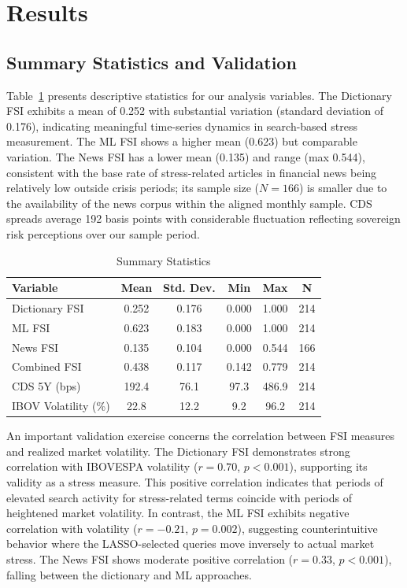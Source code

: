\section{Results}\label{sec:results}

\subsection{Summary Statistics and Validation}

Table~\ref{tab:summary} presents descriptive statistics for our analysis variables. The Dictionary FSI exhibits a mean of 0.252 with substantial variation (standard deviation of 0.176), indicating meaningful time-series dynamics in search-based stress measurement. The ML FSI shows a higher mean (0.623) but comparable variation. The News FSI has a lower mean (0.135) and range (max 0.544), consistent with the base rate of stress-related articles in financial news being relatively low outside crisis periods; its sample size ($N = 166$) is smaller due to the availability of the news corpus within the aligned monthly sample. CDS spreads average 192 basis points with considerable fluctuation reflecting sovereign risk perceptions over our sample period.

\begin{table}[htbp]
\centering
\caption{Summary Statistics}\label{tab:summary}
\begin{tabular}{lccccc}
\hline
Variable & Mean & Std. Dev. & Min & Max & N \\
\hline
Dictionary FSI & 0.252 & 0.176 & 0.000 & 1.000 & 214 \\
ML FSI & 0.623 & 0.183 & 0.000 & 1.000 & 214 \\
News FSI & 0.135 & 0.104 & 0.000 & 0.544 & 166 \\
Combined FSI & 0.438 & 0.117 & 0.142 & 0.779 & 214 \\
CDS 5Y (bps) & 192.4 & 76.1 & 97.3 & 486.9 & 214 \\
IBOV Volatility (\%) & 22.8 & 12.2 & 9.2 & 96.2 & 214 \\
\hline
\end{tabular}
\end{table}

An important validation exercise concerns the correlation between FSI measures and realized market volatility. The Dictionary FSI demonstrates strong correlation with IBOVESPA volatility ($r = 0.70$, $p < 0.001$), supporting its validity as a stress measure. This positive correlation indicates that periods of elevated search activity for stress-related terms coincide with periods of heightened market volatility. In contrast, the ML FSI exhibits negative correlation with volatility ($r = -0.21$, $p = 0.002$), suggesting counterintuitive behavior where the LASSO-selected queries move inversely to actual market stress. The News FSI shows moderate positive correlation ($r = 0.33$, $p < 0.001$), falling between the dictionary and ML approaches.

